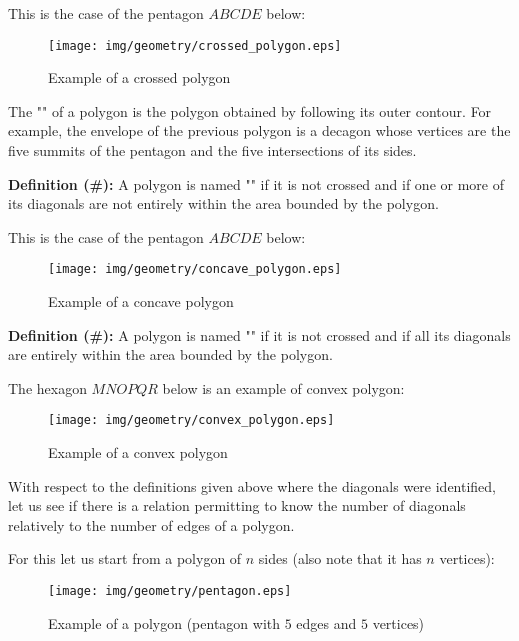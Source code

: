 {This is the case of the pentagon $ABCDE$ below:

\begin{figure}[H]
\centering
\texttt{[image: img/geometry/crossed\_polygon.eps]}
\caption{Example of a crossed polygon}
\end{figure}

	\begin{tcolorbox}[title=Remark,colframe=black,arc=10pt]
The "" of a polygon is the polygon obtained by following its outer contour. For example, the envelope of  the previous polygon is a decagon whose vertices are the five summits of the pentagon and the five intersections of its sides.
	\end{tcolorbox}	

	\textbf{Definition (\#\mydef):} A polygon is named "" if it is not crossed and if one or more of its diagonals are not entirely within the area bounded by the polygon.

This is the case of the pentagon $ABCDE$ below:

\begin{figure}[H]
\centering
\texttt{[image: img/geometry/concave\_polygon.eps]}
\caption{Example of a concave polygon}
\end{figure}

	\textbf{Definition (\#\mydef):} A polygon is named "" if it is not crossed and if all its diagonals are entirely within the area bounded by the polygon. 

The hexagon $MNOPQR$ below is an example of convex polygon:
\begin{figure}[H]
\centering
\texttt{[image: img/geometry/convex\_polygon.eps]}
\caption{Example of a convex polygon}
\end{figure}

With respect to the definitions given above where the diagonals were identified, let us see if there is a relation permitting to know the number of diagonals relatively to the number of edges of a polygon.

For this let us start from a  polygon of $n$ sides (also note that it has $n$ vertices):

\begin{figure}[H]
\centering
\texttt{[image: img/geometry/pentagon.eps]}
\caption{Example of a polygon (pentagon with $5$ edges and $5$ vertices)}
\end{figure}

}
